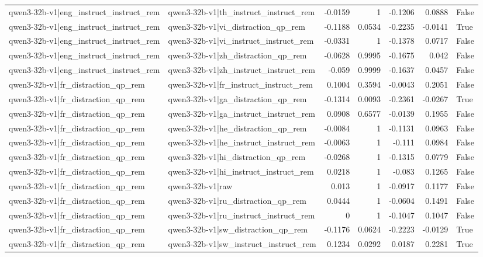 \begin{table}
\begin{tabular}{l l r r r r l}
qwen3-32b-v1|eng_instruct_instruct_rem & qwen3-32b-v1|th_instruct_instruct_rem & -0.0159 & 1 & -0.1206 & 0.0888 & False \\
qwen3-32b-v1|eng_instruct_instruct_rem & qwen3-32b-v1|vi_distraction_qp_rem & -0.1188 & 0.0534 & -0.2235 & -0.0141 & True \\
qwen3-32b-v1|eng_instruct_instruct_rem & qwen3-32b-v1|vi_instruct_instruct_rem & -0.0331 & 1 & -0.1378 & 0.0717 & False \\
qwen3-32b-v1|eng_instruct_instruct_rem & qwen3-32b-v1|zh_distraction_qp_rem & -0.0628 & 0.9995 & -0.1675 & 0.042 & False \\
qwen3-32b-v1|eng_instruct_instruct_rem & qwen3-32b-v1|zh_instruct_instruct_rem & -0.059 & 0.9999 & -0.1637 & 0.0457 & False \\
qwen3-32b-v1|fr_distraction_qp_rem & qwen3-32b-v1|fr_instruct_instruct_rem & 0.1004 & 0.3594 & -0.0043 & 0.2051 & False \\
qwen3-32b-v1|fr_distraction_qp_rem & qwen3-32b-v1|ga_distraction_qp_rem & -0.1314 & 0.0093 & -0.2361 & -0.0267 & True \\
qwen3-32b-v1|fr_distraction_qp_rem & qwen3-32b-v1|ga_instruct_instruct_rem & 0.0908 & 0.6577 & -0.0139 & 0.1955 & False \\
qwen3-32b-v1|fr_distraction_qp_rem & qwen3-32b-v1|he_distraction_qp_rem & -0.0084 & 1 & -0.1131 & 0.0963 & False \\
qwen3-32b-v1|fr_distraction_qp_rem & qwen3-32b-v1|he_instruct_instruct_rem & -0.0063 & 1 & -0.111 & 0.0984 & False \\
qwen3-32b-v1|fr_distraction_qp_rem & qwen3-32b-v1|hi_distraction_qp_rem & -0.0268 & 1 & -0.1315 & 0.0779 & False \\
qwen3-32b-v1|fr_distraction_qp_rem & qwen3-32b-v1|hi_instruct_instruct_rem & 0.0218 & 1 & -0.083 & 0.1265 & False \\
qwen3-32b-v1|fr_distraction_qp_rem & qwen3-32b-v1|raw & 0.013 & 1 & -0.0917 & 0.1177 & False \\
qwen3-32b-v1|fr_distraction_qp_rem & qwen3-32b-v1|ru_distraction_qp_rem & 0.0444 & 1 & -0.0604 & 0.1491 & False \\
qwen3-32b-v1|fr_distraction_qp_rem & qwen3-32b-v1|ru_instruct_instruct_rem & 0 & 1 & -0.1047 & 0.1047 & False \\
qwen3-32b-v1|fr_distraction_qp_rem & qwen3-32b-v1|sw_distraction_qp_rem & -0.1176 & 0.0624 & -0.2223 & -0.0129 & True \\
qwen3-32b-v1|fr_distraction_qp_rem & qwen3-32b-v1|sw_instruct_instruct_rem & 0.1234 & 0.0292 & 0.0187 & 0.2281 & True \\

\end{tabular}
\end{table}
